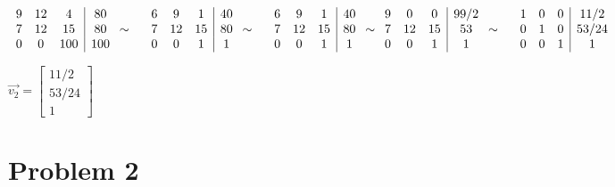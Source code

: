 \documentclass[12pt]{article}
\begin{document}
\begin{center}
    $
        \begin{array}{ccc|c}
            9 & 12 & 4   & 80  \\
            7 & 12 & 15  & 80  \\
            0 & 0  & 100 & 100
        \end{array}
        \sim\hspace{1em}
        \begin{array}{ccc|c}
            6 & 9  & 1  & 40 \\
            7 & 12 & 15 & 80 \\
            0 & 0  & 1  & 1
        \end{array}
        \sim \hspace{1em}
        \begin{array}{ccc|c}
            6 & 9  & 1  & 40 \\
            7 & 12 & 15 & 80 \\
            0 & 0  & 1  & 1
        \end{array}
        \sim\newline
        \begin{array}{ccc|c}
            9 & 0  & 0  & 99/2 \\
            7 & 12 & 15 & 53   \\
            0 & 0  & 1  & 1
        \end{array}
        \sim\hspace{1em}
        \begin{array}{ccc|c}
            1 & 0 & 0 & 11/2  \\
            0 & 1 & 0 & 53/24 \\
            0 & 0 & 1 & 1
        \end{array}
    $

    $
        \vec{v_2} =
        \begin{bmatrix}
            11/2 \\
            53/24   \\
            1
        \end{bmatrix}
    $
\end{center}

\newpage

\section*{Problem 2}
\end{document}
